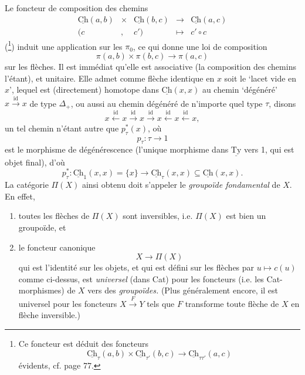 \documentclass[11pt]{article}
\newcommand{\printedpage}[1]{\marginpar{\footnotesize p.~#1}}
\newcommand{\msp}[1]{\marginpar{\footnotesize [#1]}}
\newcommand{\Ch}{\underline{\mathrm{Ch}}}
\newcommand{\Ty}{\underline{\mathrm{Ty}}}
\begin{document}
\printedpage{41}
Le foncteur de composition des chemins
\[
\begin{array}{ccccc}
\Ch(a,b) & \times & \Ch(b,c) & \longrightarrow & \Ch(a,c)\\
(c & , & c') & \longmapsto & c' \circ c
\end{array}
\]
 (\footnote[17]{Ce foncteur est déduit des foncteurs
\[
\Ch_\tau(a,b) \times \Ch_{\tau'}(b,c) \longrightarrow \Ch_{\tau\tau'}(a,c)
\]
évidents, cf. page 77.}) induit une application sur les $\pi_0$, ce qui donne une loi de composition
\[
\pi(a,b) \times \pi(b,c) \longrightarrow \pi(a,c)
\]
sur les flèches. Il est immédiat qu'elle est associative (la composition des chemins l'étant), et unitaire. Elle admet comme flèche identique en $x$ soit le `lacet vide en $x$', lequel est (directement) homotope dans $\Ch(x,x)$ au chemin `dégénéré' $x \xrightarrow{\mathrm{id}} x$
\msp{page 62}
de type $\Delta_+$, ou aussi au chemin dégénéré de n'importe quel type $\tau$, disons
\[
x \xleftarrow{\mathrm{id}} x \xrightarrow{\mathrm{id}} x \xrightarrow{\mathrm{id}} x \xleftarrow{\mathrm{id}} x \xleftarrow{\mathrm{id}} x,
\]
un tel chemin n'étant autre que $p_\tau^*(x)$, où
\[
p_\tau : \tau \longrightarrow 1
\]
est le morphisme de dégénérescence (l'unique morphisme dans $\Ty$ vers 1, qui est objet final), d'où
\[
p_\tau^* : \Ch_1(x,x) = \{x\} \longrightarrow \Ch_\tau(x,x) \subseteq \Ch(x,x).
\]
La catégorie $\Pi(X)$ ainsi obtenu doit s'appeler le \textit{groupoïde fondamental} de $X$. En effet, %

\begin{enumerate}[label=\alph*)]
\item toutes les flèches de $\Pi(X)$ sont inversibles, i.e. $\Pi(X)$ est bien un groupoïde, et
\item le foncteur canonique
\[
X \longrightarrow \Pi(X)
\]
qui est l'identité sur les objets, et qui est défini sur les flèches par $u \longmapsto c(u)$ comme ci-dessus, est \textit{universel} (dans Cat) pour les foncteurs (i.e. les Cat-morphismes) de $X$ vers des \textit{groupoïdes.} (Plus généralement encore, il est universel pour les foncteurs $X \xrightarrow{F} Y$ tels que $F$ transforme toute flèche de $X$ en flèche inversible.)
\end{enumerate}
\end{document}
